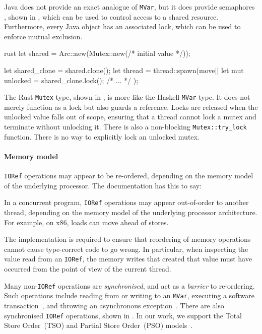 Java does not provide an exact analogue of \verb|MVar|, but it does
provide semaphores \parencite{ewd123}, shown in , which
can be used to control access to a shared resource.  Furthermore,
every Java object has an associated lock, which can be used to enforce
mutual exclusion.

\begin{listing}
\centering
\begin{cminted}{rust}
let shared = Arc::new(Mutex::new(/* initial value */));

let shared_clone = shared.clone();
let thread = thread::spawn(move|| {
    let mut unlocked = shared_clone.lock();
    /* ... */
});
\end{cminted}
\caption{Mutual exclusion in Rust.}\label{lst:mute_rust}
\end{listing}

The Rust \verb|Mutex| type, shown in , is more
like the Haskell \verb|MVar| type.  It does not merely function as a
lock but also guards a reference.  Locks are released when the
unlocked value falls out of scope, ensuring that a thread cannot lock
a mutex and terminate without unlocking it.  There is also a
non-blocking \verb|Mutex::try_lock| function.  There is no way to
explicitly lock an unlocked mutex.

\paragraph{Memory model}
\verb|IORef| operations may appear to be re-ordered, depending on the
memory model of the underlying processor.  The documentation has this
to say:

\begin{displayquote}
  In a concurrent program, \verb|IORef| operations may appear
  out-of-order to another thread, depending on the memory model of the
  underlying processor architecture.  For example, on x86, loads can
  move ahead of stores.

  The implementation is required to ensure that reordering of memory
  operations cannot cause type-correct code to go wrong.  In
  particular, when inspecting the value read from an \verb|IORef|, the
  memory writes that created that value must have occurred from the
  point of view of the current thread. \parencite{data_ioref}
\end{displayquote}

Many non-\verb|IORef| operations are \emph{synchronised}, and act as a
\emph{barrier} to re-ordering.  Such operations include reading from
or writing to an \verb|MVar|, executing a software
transaction~, and throwing an
asynchronous exception~.  There are also
synchronised \verb|IORef| operations, shown in
.  In our work, we support the Total Store
Order~(TSO) \parencite{owens2009} and Partial Store Order~(PSO) \parencite{sparc}
models~.

